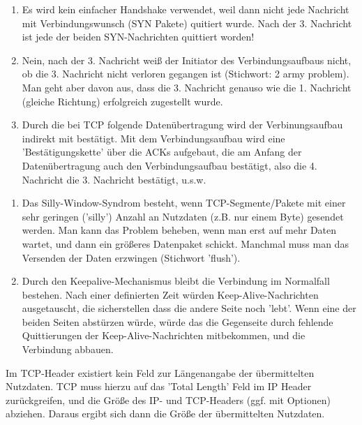 
\begin{enumerate}
    \item Es wird kein einfacher Handshake verwendet, weil dann nicht jede Nachricht mit Verbindungswunsch (SYN Pakete) quitiert wurde. Nach der 3. Nachricht ist jede der beiden SYN-Nachrichten quittiert worden!
    \item Nein, nach der 3. Nachricht weiß der Initiator des Verbindungsaufbaus nicht, ob die 3. Nachricht nicht verloren gegangen ist (Stichwort: 2 army problem). Man geht aber davon aus, dass die 3. Nachricht genauso wie die 1. Nachricht (gleiche Richtung) erfolgreich zugestellt wurde.
    \item Durch die bei TCP folgende Datenübertragung wird der Verbinungsaufbau indirekt mit bestätigt. Mit dem Verbindungsaufbau wird eine 'Bestätigungskette' über die ACKs aufgebaut, die am Anfang der Datenübertragung auch den Verbindungsaufbau bestätigt, also die 4. Nachricht die 3. Nachricht bestätigt, u.s.w.
\end{enumerate}

\begin{enumerate}
    \item Das Silly-Window-Syndrom besteht, wenn TCP-Segmente/Pakete mit einer sehr geringen ('silly') Anzahl an Nutzdaten (z.B. nur einem Byte) gesendet werden. Man kann das Problem beheben, wenn man erst auf mehr Daten wartet, und dann ein größeres Datenpaket schickt. Manchmal muss man das Versenden der Daten erzwingen (Stichwort 'flush').
    \item Durch den Keepalive-Mechanismus bleibt die Verbindung im Normalfall bestehen. Nach einer definierten Zeit würden Keep-Alive-Nachrichten ausgetauscht, die sicherstellen dass die andere Seite noch 'lebt'. Wenn eine der beiden Seiten abstürzen würde, würde das die Gegenseite durch fehlende Quittierungen der Keep-Alive-Nachrichten mitbekommen, und die Verbindung abbauen.
\end{enumerate}

Im TCP-Header existiert kein Feld zur Längenangabe der übermittelten Nutzdaten. TCP muss hierzu auf das 'Total Length' Feld im IP Header zurückgreifen, und die Größe des IP- und TCP-Headers (ggf. mit Optionen) abziehen. Daraus ergibt sich dann die Größe der übermittelten Nutzdaten.

